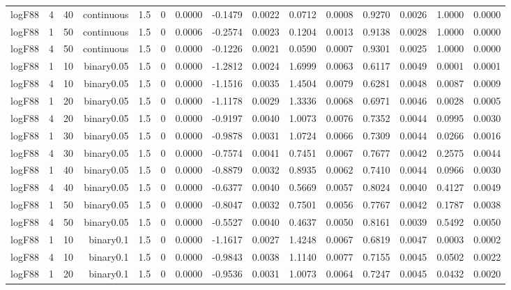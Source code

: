 \begin{longtable}{rrrrrrrrrrrrrrr}
  logF88 & 4 & 40 & continuous & 1.5 & 0 & 0.0000 & -0.1479 & 0.0022 & 0.0712 & 0.0008 & 0.9270 & 0.0026 & 1.0000 & 0.0000 \\ 
  logF88 & 1 & 50 & continuous & 1.5 & 0 & 0.0006 & -0.2574 & 0.0023 & 0.1204 & 0.0013 & 0.9138 & 0.0028 & 1.0000 & 0.0000 \\ 
  logF88 & 4 & 50 & continuous & 1.5 & 0 & 0.0000 & -0.1226 & 0.0021 & 0.0590 & 0.0007 & 0.9301 & 0.0025 & 1.0000 & 0.0000 \\ 
  logF88 & 1 & 10 & binary0.05 & 1.5 & 0 & 0.0000 & -1.2812 & 0.0024 & 1.6999 & 0.0063 & 0.6117 & 0.0049 & 0.0001 & 0.0001 \\ 
  logF88 & 4 & 10 & binary0.05 & 1.5 & 0 & 0.0000 & -1.1516 & 0.0035 & 1.4504 & 0.0079 & 0.6281 & 0.0048 & 0.0087 & 0.0009 \\ 
  logF88 & 1 & 20 & binary0.05 & 1.5 & 0 & 0.0000 & -1.1178 & 0.0029 & 1.3336 & 0.0068 & 0.6971 & 0.0046 & 0.0028 & 0.0005 \\ 
  logF88 & 4 & 20 & binary0.05 & 1.5 & 0 & 0.0000 & -0.9197 & 0.0040 & 1.0073 & 0.0076 & 0.7352 & 0.0044 & 0.0995 & 0.0030 \\ 
  logF88 & 1 & 30 & binary0.05 & 1.5 & 0 & 0.0000 & -0.9878 & 0.0031 & 1.0724 & 0.0066 & 0.7309 & 0.0044 & 0.0266 & 0.0016 \\ 
  logF88 & 4 & 30 & binary0.05 & 1.5 & 0 & 0.0000 & -0.7574 & 0.0041 & 0.7451 & 0.0067 & 0.7677 & 0.0042 & 0.2575 & 0.0044 \\ 
  logF88 & 1 & 40 & binary0.05 & 1.5 & 0 & 0.0000 & -0.8879 & 0.0032 & 0.8935 & 0.0062 & 0.7410 & 0.0044 & 0.0966 & 0.0030 \\ 
  logF88 & 4 & 40 & binary0.05 & 1.5 & 0 & 0.0000 & -0.6377 & 0.0040 & 0.5669 & 0.0057 & 0.8024 & 0.0040 & 0.4127 & 0.0049 \\ 
  logF88 & 1 & 50 & binary0.05 & 1.5 & 0 & 0.0000 & -0.8047 & 0.0032 & 0.7501 & 0.0056 & 0.7767 & 0.0042 & 0.1787 & 0.0038 \\ 
  logF88 & 4 & 50 & binary0.05 & 1.5 & 0 & 0.0000 & -0.5527 & 0.0040 & 0.4637 & 0.0050 & 0.8161 & 0.0039 & 0.5492 & 0.0050 \\ 
  logF88 & 1 & 10 & binary0.1 & 1.5 & 0 & 0.0000 & -1.1617 & 0.0027 & 1.4248 & 0.0067 & 0.6819 & 0.0047 & 0.0003 & 0.0002 \\ 
  logF88 & 4 & 10 & binary0.1 & 1.5 & 0 & 0.0000 & -0.9843 & 0.0038 & 1.1140 & 0.0077 & 0.7155 & 0.0045 & 0.0502 & 0.0022 \\ 
  logF88 & 1 & 20 & binary0.1 & 1.5 & 0 & 0.0000 & -0.9536 & 0.0031 & 1.0073 & 0.0064 & 0.7247 & 0.0045 & 0.0432 & 0.0020 \\ 

\end{longtable}
